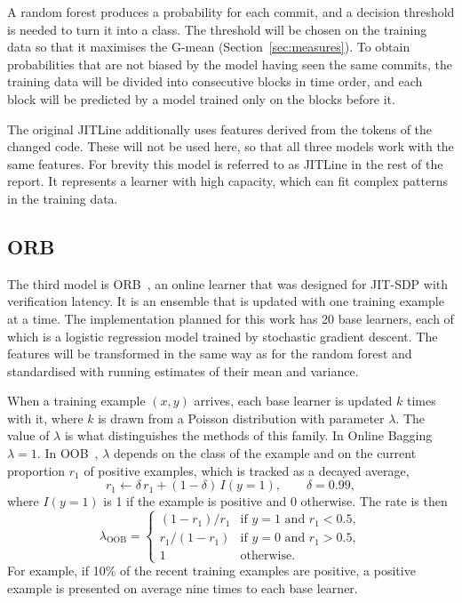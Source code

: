 \documentclass[12pt,a4paper,oneside]{report}
\begin{document}
A random forest produces a probability for each commit, and a decision
threshold is needed to turn it into a class. The threshold will be chosen on
the training data so that it maximises the G-mean
(Section~\ref{sec:measures}). To obtain probabilities that are not biased by
the model having seen the same commits, the training data will be divided
into consecutive blocks in time order, and each block will be predicted by a
model trained only on the blocks before it.

The original JITLine additionally uses features derived from the tokens of
the changed code. These will not be used here, so that all three models work
with the same features. For brevity this model is referred to as JITLine in
the rest of the report. It represents a learner with high capacity, which can
fit complex patterns in the training data.

\subsection{ORB}

The third model is ORB~\cite{cabral2019orb}, an online learner that was
designed for JIT-SDP with verification latency. It is an ensemble that is
updated with one training example at a time. The implementation planned for
this work has 20 base learners, each of which is a logistic regression model
trained by stochastic gradient descent. The features will be transformed in
the same way as for the random forest and standardised with running estimates
of their mean and variance.

When a training example $(x, y)$ arrives, each base learner is updated $k$
times with it, where $k$ is drawn from a Poisson distribution with parameter
$\lambda$. The value of $\lambda$ is what distinguishes the methods of this
family. In Online Bagging $\lambda = 1$. In OOB~\cite{wang2015oob}, $\lambda$
depends on the class of the example and on the current proportion $r_1$ of
positive examples, which is tracked as a decayed average,
\begin{equation}
r_1 \leftarrow \delta\, r_1 + (1-\delta)\,I(y=1), \qquad \delta = 0.99,
\end{equation}
where $I(y=1)$ is 1 if the example is positive and 0 otherwise. The rate is
then
\begin{equation}
\lambda_{\mathrm{OOB}} =
\begin{cases}
(1-r_1)/r_1 & \text{if } y=1 \text{ and } r_1 < 0.5,\\
r_1/(1-r_1) & \text{if } y=0 \text{ and } r_1 > 0.5,\\
1 & \text{otherwise.}
\end{cases}
\label{eq:oob}
\end{equation}
For example, if 10\% of the recent training examples are positive, a positive
example is presented on average nine times to each base learner.
\end{document}
